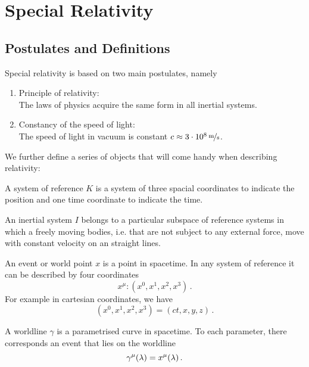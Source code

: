 \chapter{Special Relativity}
\section{Postulates and Definitions}
Special relativity is based on two main postulates, namely
\begin{enumerate}
\item Principle of relativity: \\
The laws of physics acquire the same form in all inertial systems.
\item Constancy of the speed of light:\\
The speed of light in vacuum is constant ${c\approx\unitfrac[3\cdot
10^8]{m}{s}}$.
\end{enumerate}
We further define a series of objects that will come handy when describing
relativity:
\begin{definition}
A system of reference $K$ is a system of three spacial coordinates to indicate
the position and one time coordinate to indicate the time.
\end{definition}
\begin{definition}
An inertial system $I$ belongs to a particular subspace of reference systems in
which a freely moving bodies, i.e. that are not subject to any external
force, move with constant velocity on an straight lines.
\end{definition}
\begin{definition}[Event]
An event or world point $x$ is a point in spacetime. In any system of reference
it can be described by four coordinates 
\begin{equation}
x^\mu: (x^0,x^1,x^2,x^3)\, .
\end{equation}
For example in cartesian coordinates, we have 
\begin{equation}
(x^0,x^1,x^2,x^3) = (ct,x,y,z)\, .
\end{equation}
\end{definition}
\begin{definition}[Worldline]
A worldline $\gamma$ is a parametrised curve in spacetime. To each parameter,
there corresponds an event that lies on the worldline
\begin{equation}
\tensor{\gamma}{^\mu}(\lambda)=\tensor{x}{^\mu}(\lambda)\, .
\end{equation}
\end{definition}
